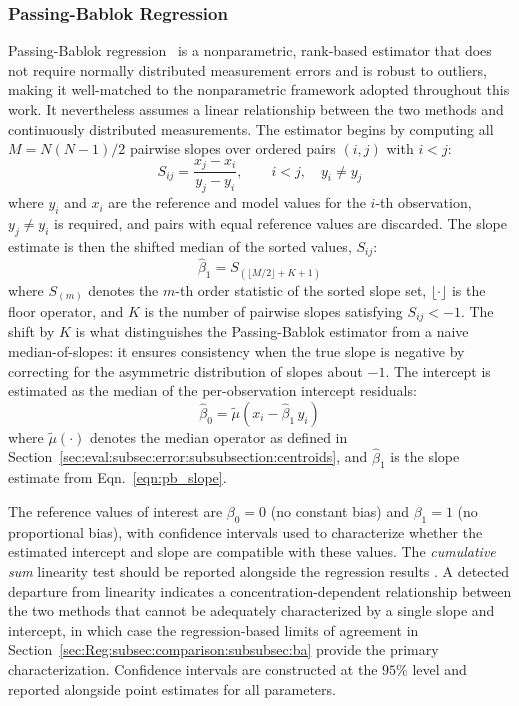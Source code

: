\subsubsection{Passing-Bablok Regression}
Passing-Bablok regression~\cite{Passing1983,Bablok1984} is a nonparametric, rank-based estimator that does not require normally distributed measurement errors and is robust to outliers, making it well-matched to the nonparametric framework adopted throughout this work. It nevertheless assumes a linear relationship between the two methods and continuously distributed measurements. The estimator begins by computing all $M = N(N-1)/2$ pairwise slopes over ordered pairs $(i,j)$ with $i < j$:
\begin{equation}\label{eqn:pb_slopes}
    S_{ij} = \frac{x_j - x_i}{y_j - y_i}, \qquad i < j, \quad y_i \neq y_j
\end{equation}
\noindent where $y_i$ and $x_i$ are the reference and \DL model values for the $i$-th observation, $y_j \neq y_i$ is required, and pairs with equal reference values are discarded. The slope estimate is then the shifted median of the sorted values, $S_{ij}$:
\begin{equation}\label{eqn:pb_slope}
    \hat{\beta}_1 = S_{\left(\lfloor M/2 \rfloor + K + 1\right)}
\end{equation}
\noindent where $S_{(m)}$ denotes the $m$-th order statistic of the sorted slope set, $\lfloor \cdot \rfloor$ is the floor operator, and $K$ is the number of pairwise slopes satisfying $S_{ij} < -1$. The shift by $K$ is what distinguishes the Passing-Bablok estimator from a naive median-of-slopes: it ensures consistency when the true slope is negative by correcting for the asymmetric distribution of slopes about $-1$. The intercept is estimated as the median of the per-observation intercept residuals:
\begin{equation}\label{eqn:pb_intercept}
    \hat{\beta}_0 = \widetilde{\mu}\!\left(x_i - \hat{\beta}_1\, y_i\right)
\end{equation}
\noindent where $\widetilde{\mu}(\cdot)$ denotes the median operator as defined in Section~\ref{sec:eval:subsec:error:subsubsection:centroids}, and $\hat{\beta}_1$ is the slope estimate from Eqn.~\ref{eqn:pb_slope}.

The reference values of interest are $\beta_0 = 0$ (no constant bias) and $\beta_1 = 1$ (no proportional bias), 
with confidence intervals used to characterize whether the estimated intercept and slope are compatible with these values. The \textit{cumulative sum} linearity test should be reported alongside the regression results \cite{Passing1983,Bilic-Zulle2011}. A detected departure from linearity indicates a concentration-dependent relationship between the two methods that cannot be adequately characterized by a single slope and intercept, in which case the regression-based limits of agreement in Section~\ref{sec:Reg:subsec:comparison:subsubsec:ba} provide the primary characterization. Confidence intervals are constructed at the $95\%$ level and reported alongside point estimates for all parameters.

